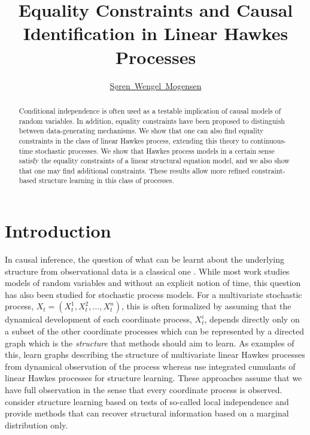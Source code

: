 \documentclass[accepted]{uai2021} %
\title{Equality Constraints and Causal Identification in Linear Hawkes 
Processes}
\author[1]{\href{mailto: Søren Wengel Mogensen 
<swemo@dtu.dk>}{Søren~Wengel~Mogensen}{}}
\affil[1]{%
    Section of Cognitive Systems\\
    Technical University of Denmark\\
    Denmark
}
\begin{document}
\maketitle

\begin{abstract}
Conditional independence is often used as a testable 
implication of causal models of random variables. In addition, equality 
constraints have been proposed to distinguish between data-generating 
mechanisms. We show that one 
can also find equality constraints in the class of linear Hawkes process, 
extending this theory to continuous-time stochastic processes. We 
show that Hawkes process models in a certain sense satisfy the equality 
constraints 
of a linear structural equation model, and we also show that one may 
find additional constraints. These results
allow more refined constraint-based structure learning in this class of 
processes.
\end{abstract}


\section{Introduction}\label{sec:intro}

In causal inference, the question of what can be learnt about the underlying 
structure from observational data is a classical one 
\citep{spirtes1993,pearl2009}. While most work 
studies models of random variables and without an explicit notion of time, this 
question has also been 
studied for stochastic process models. For a multivariate stochastic 
process, $X_t = (X_t^1, X_t^2, \ldots, X_t^n)$, this is often formalized by 
assuming that the dynamical development of each coordinate process, $X_t^i$,   
depends directly only on a subset of the other coordinate processes which can 
be 
represented by a directed graph which is the \emph{structure} that methods 
should aim to learn. As examples of this, \cite{eichlerHawkes2017, xu2016} learn
graphs describing the structure of multivariate linear Hawkes processes from 
dynamical observation of the process whereas 
\cite{achab2017} use integrated cumulants of 
linear Hawkes processes for structure learning. 
These approaches assume that we have full observation in the sense that every 
coordinate 
process is observed. \cite{meek2014, mogensenUAI2018, mogensenUAI2020} consider 
structure learning based on tests of so-called local independence and provide 
methods 
that can recover structural information based on a marginal distribution only. 
\end{document}

